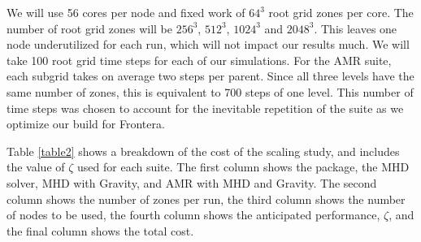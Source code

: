 We will use 56 cores per node and fixed work of $64^3$ root grid zones per core.
The number of root grid zones will be $256^3$, $512^3$, $1024^3$ and $2048^3$.
This leaves one node underutilized for each run, which will not impact our
results much.  We will take 100 root grid time steps for each of our
simulations.  For the AMR suite, each subgrid takes on average two steps per
parent.  Since all three levels have the same number of zones,  this is
equivalent to 700 steps of one level.  
This number of time steps was chosen to account for the inevitable repetition
of the suite as we optimize our build for Frontera.



Table \ref{table2} shows a breakdown of the cost of the scaling study, and
includes the value of $\zeta$ used for each suite.  The first column shows the
package, the MHD solver, MHD with Gravity, and AMR with MHD and Gravity.  
The second column shows the number
of zones per run, the third column shows the number of nodes to be used, the
fourth column shows the anticipated performance, $\zeta$, and the final column
shows the total cost.  


